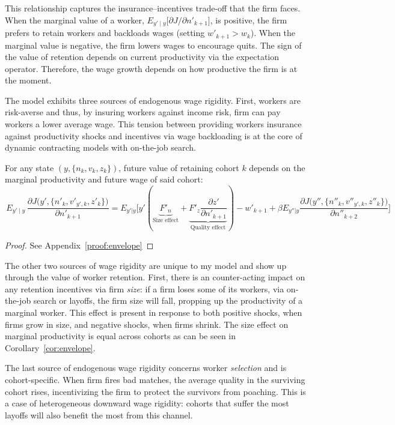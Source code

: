 This relationship captures the insurance–incentives trade-off that the firm faces. When the marginal value of a worker,
$E_{y'\mid y}\big[\partial J/\partial n'_{k+1}\big]$, is positive, the firm prefers to retain workers and backloads wages (setting $w'_{k+1}>w_k$). When the marginal value is negative, the firm lowers wages to encourage quits. The sign of the value of retention depends on current productivity via the expectation operator. Therefore, the wage growth depends on how productive the firm is at the moment. 

The model exhibits three sources of endogenous wage rigidity. First, workers are risk-averse and thus, by insuring workers against income risk, firm can pay workers a lower average wage. This tension between providing workers insurance against productivity shocks and incentives via wage backloading is at the core of dynamic contracting models with on-the-job search.

\begin{corollary}\label{cor:envelope}
        For any state $(y,\{n_k,v_k,z_k\})$, future value of retaining cohort $k$ depends on the marginal productivity and future wage of said cohort:
        \[
        \,E_{y'\mid y}\,\frac{\partial J\big(y',\{n'_k,v'_{y',k},z'_k\}\big)}{\partial n'_{k+1}} = 
        E_{y'|y}\Big[y'(\underbrace{F'_n}_\text{Size effect}+\underbrace{F'_z \frac{\partial z'}{\partial n'_{k+1}}}_\text{Quality effect})-w'_{k+1}+\beta E_{y''|y}\frac{\partial J\big(y'',\{n''_k,v''_{y',k},z''_k\}\big)}{\partial n''_{k+2}}\Big]
        \]
\end{corollary}
\begin{proof}
    See Appendix~\ref{proof:envelope}
\end{proof}
The other two sources of wage rigidity are unique to my model and show up through the value of worker retention. First, there is an counter-acting impact on any retention incentives via firm \emph{size}: if a firm loses some of its workers, via on-the-job search or layoffs, the firm size will fall, propping up the productivity of a marginal worker. This effect is present in response to both positive shocks, when firms grow in size, and negative shocks, when firms shrink. The size effect on marginal productivity is equal across cohorts as can be seen in Corollary~\ref{cor:envelope}.

The last source of endogenous wage rigidity concerns worker \emph{selection} and is cohort-specific. When firm fires bad matches, the average quality in the surviving cohort rises, incentivizing the firm to protect the survivors from poaching. This is a case of heterogeneous downward wage rigidity: cohorts that suffer the most layoffs will also benefit the most from this channel.

